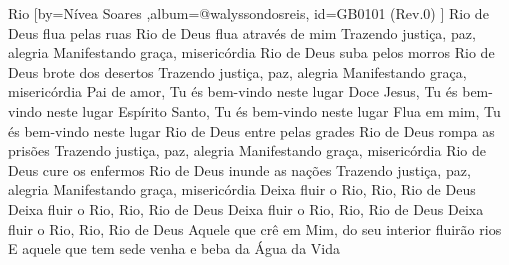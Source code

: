 \beginsong
{Rio %
}[by={Nívea Soares %
},album={@walyssondosreis},
id={GB0101 %
(Rev.0) %
}]
\beginverse*
Rio de Deus flua pelas ruas
Rio de Deus flua através de mim
Trazendo justiça, paz, alegria
Manifestando graça, misericórdia
\endverse
\beginverse*
Rio de Deus suba pelos morros
Rio de Deus brote dos desertos
Trazendo justiça, paz, alegria
Manifestando graça, misericórdia
\endverse
\beginchorus
Pai de amor, Tu és bem-vindo neste lugar
Doce Jesus, Tu és bem-vindo neste lugar
Espírito Santo, Tu és bem-vindo neste lugar
Flua em mim, Tu és bem-vindo neste lugar
\endchorus
\beginverse*
Rio de Deus entre pelas grades
Rio de Deus rompa as prisões
Trazendo justiça, paz, alegria
Manifestando graça, misericórdia
\endverse
\beginverse*
Rio de Deus cure os enfermos
Rio de Deus inunde as nações
Trazendo justiça, paz, alegria
Manifestando graça, misericórdia
\endverse
\beginverse*
Deixa fluir o Rio, Rio, Rio de Deus
Deixa fluir o Rio, Rio, Rio de Deus
Deixa fluir o Rio, Rio, Rio de Deus
Deixa fluir o Rio, Rio, Rio de Deus
\endverse
\beginverse*
Aquele que crê em Mim, do seu interior fluirão rios
E aquele que tem sede venha e beba da Água da Vida
\endverse

